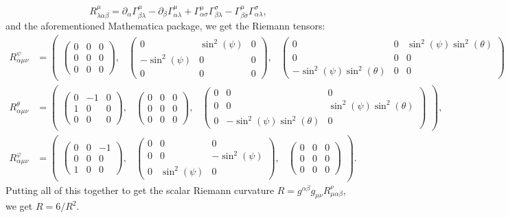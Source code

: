 \documentclass{../../templates/lkx_pset}
\begin{document}
\begin{parts}
\[    R^{\mu}_{\lambda\alpha\beta} = \partial_\alpha \Gamma^\mu_{\beta\lambda} - \partial_\beta \Gamma^\mu_{\alpha\lambda} + \Gamma^\mu_{\alpha\sigma}\Gamma^\sigma_{\beta\lambda} -\Gamma^\mu_{\beta\sigma}\Gamma^\sigma_{\alpha\lambda},
  \]
  and the aforementioned Mathematica package, we get the Riemann tensors:
\[
\begin{aligned}
  R^\psi_{\alpha\mu\nu} &= \begin{pmatrix}
\begin{pmatrix}
0 & 0 & 0 \\
0 & 0 & 0 \\
0 & 0 & 0
\end{pmatrix}, &
\begin{pmatrix}
0 & \sin^2(\psi) & 0 \\
-\sin^2(\psi) & 0 & 0 \\
0 & 0 & 0
\end{pmatrix}, &
\begin{pmatrix}
0 & 0 & \sin^2(\psi)\sin^2(\theta) \\
0 & 0 & 0 \\
-\sin^2(\psi)\sin^2(\theta) & 0 & 0
\end{pmatrix}
\end{pmatrix}, \\
    R^\theta_{\alpha\mu\nu} &= \begin{pmatrix}
\begin{pmatrix}
0 & -1 & 0 \\
1 & 0 & 0 \\
0 & 0 & 0
\end{pmatrix}, &
\begin{pmatrix}
0 & 0 & 0 \\
0 & 0 & 0 \\
0 & 0 & 0
\end{pmatrix}, &
\begin{pmatrix}
0 & 0 & 0 \\
0 & 0 & \sin^2(\psi)\sin^2(\theta) \\
0 & -\sin^2(\psi)\sin^2(\theta) & 0
\end{pmatrix}
\end{pmatrix}, \\
      R^\varphi_{\alpha\mu\nu} &= \begin{pmatrix}
\begin{pmatrix}
0 & 0 & -1 \\
0 & 0 & 0 \\
1 & 0 & 0
\end{pmatrix}, &
\begin{pmatrix}
0 & 0 & 0 \\
0 & 0 & -\sin^2(\psi) \\
0 & \sin^2(\psi) & 0
\end{pmatrix}, &
\begin{pmatrix}
0 & 0 & 0 \\
0 & 0 & 0 \\
0 & 0 & 0
\end{pmatrix}
\end{pmatrix}.
\end{aligned}
\]
Putting all of this together to get the scalar Riemann curvature $R=g^{\alpha\beta}g_{\mu\nu}R^{\nu}_{\mu\alpha\beta}$, we get $R = 6/R^2$.


\end{parts}
\end{document}
